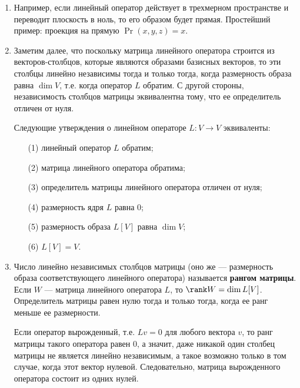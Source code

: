 \begin{enumerate}
\item Например, если линейный оператор действует в трехмерном пространстве и переводит плоскость в ноль, то его образом будет прямая. Простейший пример: проекция на прямую $\Pr(x,y,z) = x$. 
\item Заметим далее, что поскольку матрица линейного оператора строится из векторов-столбцов, которые являются образами базисных векторов, то эти столбцы линейно независимы тогда и только тогда, когда размерность образа равна $\dim V$, т.е. когда оператор $L$ обратим. С другой стороны, независимость столбцов матрицы эквивалентна тому, что ее определитель отличен от нуля.
\begin{thrm} Следующие утверждения о линейном операторе $L:V\to V$ эквиваленты:
\begin{enumerate}[\textup{(1)}]
\item[\textup{(1)}] линейный оператор $L$ обратим;
\item[\textup{(2)}] матрица линейного оператора обратима;
\item[\textup{(3)}] определитель матрицы линейного оператора отличен от нуля;
\item[\textup{(4)}] размерность ядря $L$ равна 0;
\item[\textup{(5)}] размерность образа $L[V]$ равна $\dim V$;
\item[\textup{(6)}] $L[V]=V$.
\end{enumerate}
\end{thrm}
\item Число линейно независимых столбцов матрицы (оно же --- размерность образа соответствующего линейного оператора) называется \textbf{рангом матрицы}. Если $W$ --- матрица линейного оператора $L$, то $\rank W=\dim L[V]$. Определитель матрицы равен нулю тогда и только тогда, когда ее ранг меньше ее размерности.

Если оператор вырожденный, т.е. $Lv=0$ для любого вектора $v$, то ранг матрицы такого оператора равен 0, а значит, даже никакой один столбец матрицы не является линейно независимым, а такое возможно только в том случае, когда этот вектор нулевой. Следовательно, матрица вырожденного оператора состоит из одних нулей.
\end{enumerate}






